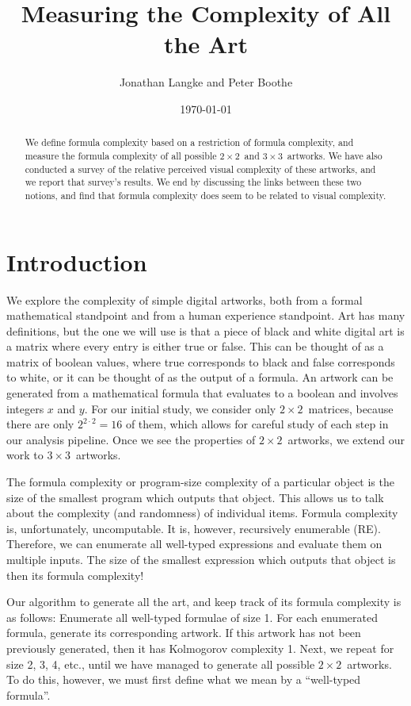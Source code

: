 \documentclass[11pt]{article}
\title{Measuring the Complexity of All the Art}
\author{Jonathan Langke and Peter Boothe}
\date{\today}
\newcommand{\twoxtwo}{$2\times2$}
\newcommand{\threexthree}{$3\times3$}
\begin{document}
\maketitle

\begin{abstract}
We define formula complexity based on a restriction of formula complexity,
and measure the formula complexity of all possible \twoxtwo\ and \threexthree\
artworks.  We have also conducted a survey of the relative perceived visual
complexity of these artworks, and we report that survey's results.  We end by
discussing the links between these two notions, and find that formula
complexity does seem to be related to visual complexity.
\end{abstract}

\section{Introduction}

We explore the complexity of simple digital artworks, both from a formal
mathematical standpoint and from a human experience standpoint.  Art has many
definitions, but the one we will use is that a piece of black and white digital
art is a matrix where every entry is either true or false.  This can be thought
of as a matrix of boolean values, where true corresponds to black and false
corresponds to white, or it can be thought of as the output of a formula.  An
artwork can be generated from a mathematical formula that evaluates to a
boolean and involves integers $x$ and $y$.  For our initial study, we consider
only \twoxtwo\ matrices, because there are only $2^{2\cdot2} = 16$ of them,
which allows for careful study of each step in our analysis pipeline.  Once we
see the properties of \twoxtwo\ artworks, we extend our work to \threexthree\
artworks.

The formula complexity or program-size complexity of a particular object is
the size of the smallest program which outputs that object.  This allows us to
talk about the complexity (and randomness) of individual items. Formula
complexity is, unfortunately, uncomputable.  It is, however, recursively
enumerable (RE).  Therefore, we can enumerate all well-typed expressions and
evaluate them on multiple inputs.  The size of the smallest expression which
outputs that object is then its formula complexity!

Our algorithm to generate all the art, and keep track of its formula
complexity is as follows: Enumerate all well-typed formulae of size 1.  For
each enumerated formula, generate its corresponding artwork.  If this artwork
has not been previously generated, then it has Kolmogorov complexity 1.  Next,
we repeat for size 2, 3, 4, etc., until we have managed to generate all
possible \twoxtwo\ artworks.  To do this, however, we must first define what we
mean by a ``well-typed formula''.
\end{document}
